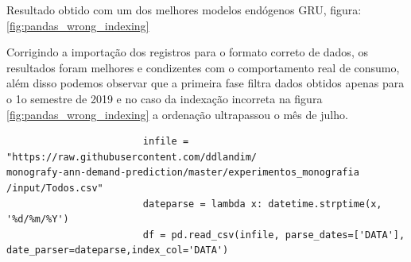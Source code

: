 \documentclass[	12pt, Times, openright, twoside, a4paper, english, brazil]{abntex2}
\begin{document}
    	            Resultado obtido com um dos melhores modelos endógenos GRU, figura: \ref{fig:pandas_wrong_indexing} 
    	            \begin{figure}[H]
                    \end{figure}
                    \newpage 
                    Corrigindo a importação dos registros para o formato correto de dados, os resultados foram melhores e condizentes com o comportamento real de consumo, além disso podemos observar que a primeira fase filtra dados obtidos apenas para o 1o semestre de 2019 e no caso da indexação incorreta na figura \ref{fig:pandas_wrong_indexing} a ordenação ultrapassou o mês de julho.
                    \begin{lstlisting}
    	                infile = "https://raw.githubusercontent.com/ddlandim/                           monografy-ann-demand-prediction/master/experimentos_monografia                   /input/Todos.csv"
                        dateparse = lambda x: datetime.strptime(x, '%d/%m/%Y')
                        df = pd.read_csv(infile, parse_dates=['DATA'], date_parser=dateparse,index_col='DATA')
    	            \end{lstlisting}
                    \begin{figure}[H]
                    \end{figure}
\end{document}

